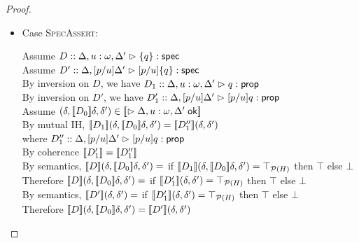 \begin{proof}
\begin{enumerate}
\begin{itemize}
  \item Case \textsc{SpecAssert}: 
    \begin{tabbedproof}
      \oo Assume $D :: \judgeS[{\Delta, u:\omega, \Delta'}]{\setof{q}}$ \\
      \oo Assume $D' :: \judgeS[{\Delta, [p/u]\Delta'}]{[p/u]\setof{q}}$ \\
      \ooo By inversion on $D$, we have $D_1 :: \judgeA[{\Delta, u:\omega, \Delta'}]{q}{\assert}$ \\
      \ooo By inversion on $D'$, we have $D'_1 :: \judgeA[{\Delta, [p/u]\Delta'}]{[p/u]q}{\assert}$ \\
      \ooo Assume $(\delta, \interp{D_0}\delta, \delta') \in 
                   \interp{\judgeACtx{\Delta, u:\omega, \Delta'}}$ \\
      \ooo By mutual IH, $\interp{D_1}(\delta, \interp{D_0}\delta, \delta') =
                          \interp{D''_1}(\delta, \delta')$ \\
      \ooo where $D''_1 :: \judgeA[{\Delta, [p/u]\Delta'}]{[p/u]q}{\assert}$ \\
      \ooo By coherence $\interp{D'_1} = \interp{D''_1}$ \\
      \ooo By semantics, $\interp{D}(\delta, \interp{D_0}\delta, \delta') =$ 
              if $\interp{D_1}(\delta, \interp{D_0}\delta, \delta') = \top_{\powerset{H}}$ then $\top$ else $\bot$ \\
      \ooo Therefore $\interp{D}(\delta, \interp{D_0}\delta, \delta') =$ 
              if $\interp{D'_1}(\delta, \delta') = \top_{\powerset{H}}$ then $\top$ else $\bot$ \\
      \ooo By semantics, $\interp{D'}(\delta, \delta') =$ 
              if $\interp{D'_1}(\delta, \delta') = \top_{\powerset{H}}$ then $\top$ else $\bot$ \\
      \ooo Therefore $\interp{D}(\delta, \interp{D_0}\delta, \delta') = 
                      \interp{D'}(\delta, \delta')$ \\
    \end{tabbedproof}


\end{itemize}
\end{enumerate}
\end{proof}
